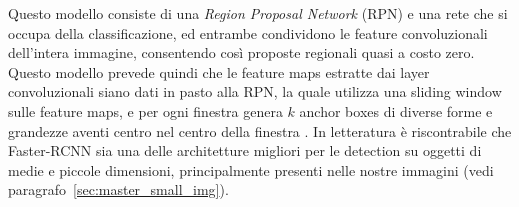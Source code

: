 Questo modello consiste di una \textit{Region Proposal Network} (RPN) e una rete che si occupa della classificazione, ed entrambe condividono le feature convoluzionali dell'intera immagine, consentendo così proposte regionali quasi a costo zero. Questo modello prevede quindi che le feature maps estratte dai layer convoluzionali siano dati in pasto alla RPN, la quale utilizza una sliding window sulle feature maps, e per ogni finestra genera $k$ anchor boxes di diverse forme e grandezze aventi centro nel centro della finestra \cite{resnet}. In letteratura è riscontrabile che Faster-RCNN sia una delle architetture migliori per le detection su oggetti di medie e piccole dimensioni, principalmente presenti nelle nostre immagini (vedi paragrafo~\ref{sec:master_small_img}).
